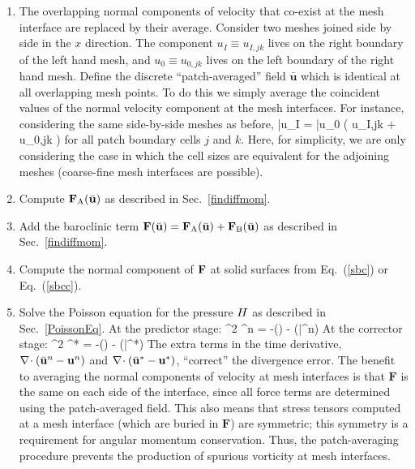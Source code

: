 \begin{enumerate}
\item The overlapping normal components of velocity that co-exist at the mesh interface are replaced by their average. Consider two meshes joined side by side in the $x$ direction. The component $u_I \equiv u_{I,jk}$ lives on the right boundary of the left hand mesh, and $u_0 \equiv u_{0,jk}$ lives on the left boundary of the right hand mesh. Define the discrete ``patch-averaged'' field $\bar{\mathbf{u}}$ which is identical at all overlapping mesh points. To do this we simply average the coincident values of the normal velocity component at the mesh interfaces. For instance, considering the same side-by-side meshes as before,
   \be
   \label{eqn_patchave_ufield}
      \bar{u}_I = \bar{u}_0 \equiv {} \left( u_{I,jk} + u_{0,jk} \right)
   \ee
   for all patch boundary cells $j$ and $k$. Here, for simplicity, we are only considering the case in which the cell sizes are equivalent for the adjoining meshes (coarse-fine mesh interfaces are possible).
\item Compute ${\mathbf{F}}_{\rm A}(\bar{\mathbf{u}})$ as described in Sec.~\ref{findiffmom}.

\item\label{step3} Add the baroclinic term ${\mathbf{F}}(\bar{\mathbf{u}})={\mathbf{F}}_{\rm A}(\bar{\mathbf{u}})+{\mathbf{F}}_{\rm B}(\bar{\mathbf{u}})$ as described in Sec.~\ref{findiffmom}.

\item Compute the normal component of ${\mathbf{F}}$ at solid surfaces from Eq.~(\ref{sbc}) or Eq.~(\ref{sbcc}).

\item Solve the Poisson equation for the pressure $H$ as described in Sec.~\ref{PoissonEq}. At the predictor stage:
\be
\label{eqn_poisson_stg1}
\nabla^2 {\cH}^n = -\left(\right) - (\bar{}^n)
\ee
At the corrector stage:
\be
\label{eqn_poisson_stg2}
\nabla^2 {\cH}^* = -\left(\right) - (\bar{}^*)
\ee
The extra terms in the time derivative, $\nabla\!\cdot (\bar{{\mathbf{u}}}^n - {\mathbf{u}}^n)$ and $\nabla\!\cdot (\bar{{\mathbf{u}}}^* - {\mathbf{u}}^*)$, ``correct'' the divergence error. The benefit to averaging the normal components of velocity at mesh interfaces is that $\mathbf{F}$ is the same on each side of the interface, since all force terms are determined using the patch-averaged field. This also means that stress tensors computed at a mesh interface (which are buried in $\mathbf{F}$) are symmetric; this symmetry is a requirement for angular momentum conservation.  Thus, the patch-averaging procedure prevents the production of spurious vorticity at mesh interfaces.


\end{enumerate}
